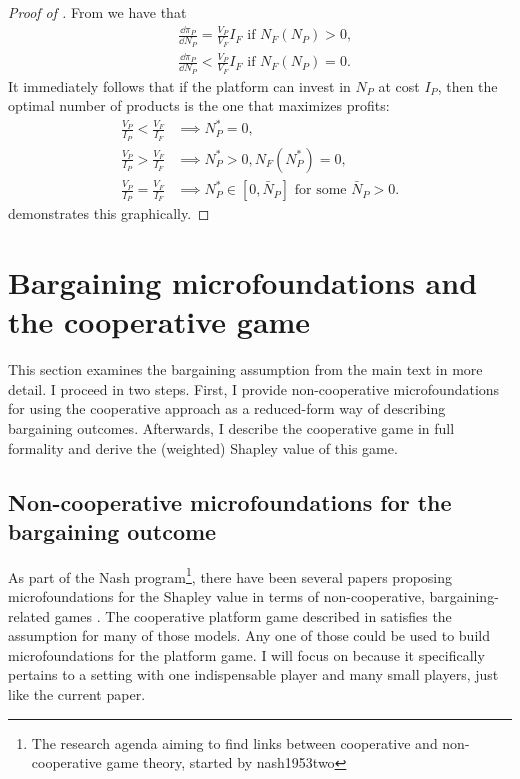\begin{proof}[Proof of ]
    From  we have that
    \begin{align*}
        &\frac{\dd \pi_P}{\dd N_P} = \frac{V_P}{V_F} I_F \text{ if } N_F(N_P) > 0, \\
        &\frac{\dd \pi_P}{\dd N_P} < \frac{V_P}{V_F} I_F \text{ if } N_F(N_P) = 0.
    \end{align*}
    It immediately follows that if the platform can invest in $N_P$ at cost $I_P$, then the optimal number of products is the one that maximizes profits:
    \begin{align*}
        \frac{V_P}{I_P} < \frac{V_F}{I_F} &\implies N_P^* = 0, \\
        \frac{V_P}{I_P} > \frac{V_F}{I_F} &\implies N_P^* > 0, N_F(N_P^*) = 0, \\
        \frac{V_P}{I_P} = \frac{V_F}{I_F} &\implies N_P^* \in [0, \bar{N}_P] \text{ for some } \bar{N}_P > 0.
    \end{align*}
     demonstrates this graphically.
\end{proof}

\section{Bargaining microfoundations and the cooperative game}
This section examines the bargaining assumption from the main text in more detail.
I proceed in two steps.
First, I provide non-cooperative microfoundations for using the cooperative approach as a reduced-form way of describing bargaining outcomes.
Afterwards, I describe the cooperative game in full formality and derive the (weighted) Shapley value of this game.

\subsection{Non-cooperative microfoundations for the bargaining outcome}
\label{sec:bargaining_microfoundation}

As part of the Nash program\footnote{
    The research agenda aiming to find links between cooperative and non-cooperative game theory, started by nash1953two
}, there have been several papers proposing microfoundations for the Shapley value in terms of non-cooperative, bargaining-related games \parencite[e.g.][]{gul1989bargaining,winter1994demand,hart1996bargaining,stole1996intra}.
The cooperative platform game described in  satisfies the assumption for many of those models.
Any one of those could be used to build microfoundations for the platform game.
I will focus on \textcite{stole1996intra} because it specifically pertains to a setting with one indispensable player and many small players, just like the current paper.

